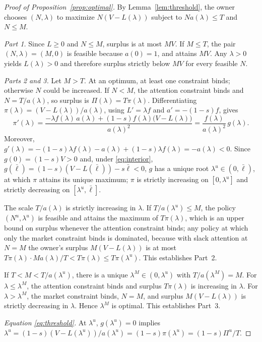 \documentclass[11pt,a4paper]{article}
\theoremstyle{plain}
\newcommand{\lbar}{\bar{\ell}}
\begin{document}
\begin{proof}[Proof of Proposition~\ref{prop:optimal}]
By Lemma~\ref{lem:threshold}, the owner chooses $(N, \lambda)$ to maximize $N(V - L(\lambda))$ subject to $N a(\lambda) \le T$ and $N \le M$.

\emph{Part 1.} Since $L \ge 0$ and $N \le M$, surplus is at most $MV$. If $M \le T$, the pair $(N, \lambda) = (M, 0)$ is feasible because $a(0) = 1$, and attains $MV$. Any $\lambda > 0$ yields $L(\lambda) > 0$ and therefore surplus strictly below $MV$ for every feasible $N$.

\emph{Parts 2 and 3.} Let $M > T$. At an optimum, at least one constraint binds; otherwise $N$ could be increased. If $N < M$, the attention constraint binds and $N = T / a(\lambda)$, so surplus is $\Pi(\lambda) = T \pi(\lambda)$. Differentiating $\pi(\lambda) = (V - L(\lambda))/a(\lambda)$, using $L' = \lambda f$ and $a' = -(1-s) f$, gives
\[
  \pi'(\lambda) = \frac{-\lambda f(\lambda) \, a(\lambda) + (1-s) f(\lambda) \big(V - L(\lambda)\big)}{a(\lambda)^2} = \frac{f(\lambda)}{a(\lambda)^2} \, g(\lambda).
\]
Moreover, $g'(\lambda) = -(1-s)\lambda f(\lambda) - a(\lambda) + (1-s)\lambda f(\lambda) = -a(\lambda) < 0$. Since $g(0) = (1-s)V > 0$ and, under \eqref{eq:interior}, $g(\lbar) = (1-s)(V - L(\lbar)) - s\lbar < 0$, $g$ has a unique root $\lambda^u \in (0, \lbar)$, at which $\pi$ attains its unique maximum; $\pi$ is strictly increasing on $[0, \lambda^u]$ and strictly decreasing on $[\lambda^u, \lbar]$.

The scale $T/a(\lambda)$ is strictly increasing in $\lambda$. If $T/a(\lambda^u) \le M$, the policy $(N^u, \lambda^u)$ is feasible and attains the maximum of $T\pi(\lambda)$, which is an upper bound on surplus whenever the attention constraint binds; any policy at which only the market constraint binds is dominated, because with slack attention at $N = M$ the owner's surplus $M(V - L(\lambda))$ is at most $T\pi(\lambda) \cdot M a(\lambda)/T < T\pi(\lambda) \le T\pi(\lambda^u)$. This establishes Part~2.

If $T < M < T/a(\lambda^u)$, there is a unique $\lambda^M \in (0, \lambda^u)$ with $T / a(\lambda^M) = M$. For $\lambda \le \lambda^M$, the attention constraint binds and surplus $T\pi(\lambda)$ is increasing in $\lambda$. For $\lambda > \lambda^M$, the market constraint binds, $N = M$, and surplus $M(V - L(\lambda))$ is strictly decreasing in $\lambda$. Hence $\lambda^M$ is optimal. This establishes Part~3.

\emph{Equation \eqref{eq:threshold}.} At $\lambda^u$, $g(\lambda^u) = 0$ implies $\lambda^u = (1-s)(V - L(\lambda^u))/a(\lambda^u) = (1-s)\pi(\lambda^u) = (1-s)\Pi^u/T$.
\end{proof}
\end{document}

